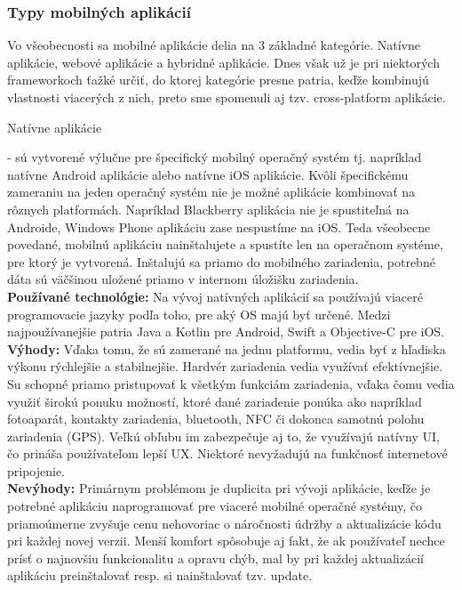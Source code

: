 \subsubsection{Typy mobilných aplikácií}
Vo všeobecnosti sa mobilné aplikácie delia na 3 základné kategórie. Natívne aplikácie, webové aplikácie a hybridné aplikácie. Dnes však už je pri niektorých frameworkoch ťažké určiť, do ktorej kategórie presne patria, keďže kombinujú vlastnosti viacerých z nich, preto sme spomenuli aj tzv. cross-platform aplikácie.
\begin{itemize}[leftmargin=*]
{\bf \item Natívne aplikácie} - sú vytvorené výlučne pre špecifický mobilný operačný systém tj. napríklad natívne Android aplikácie alebo natívne iOS aplikácie. Kvôli špecifickému zameraniu na jeden operačný systém nie je možné aplikácie kombinovať na rôznych platformách. Napríklad Blackberry aplikácia nie je spustiteľná na Androide, Windows Phone aplikáciu zase nespustíme na iOS. Teda všeobecne povedané, mobilnú aplikáciu nainštalujete a spustíte len na operačnom systéme, pre ktorý je vytvorená. Inštalujú sa priamo do mobilného zariadenia, potrebné dáta sú väčšinou uložené priamo v internom úložišku zariadenia. \\

{\bf Používané technológie:} Na vývoj natívných aplikácií sa používajú viaceré programovacie jazyky podľa toho, pre aký OS majú byť určené. Medzi najpoužívanejšie patria Java a Kotlin pre Android, Swift a Objective-C pre iOS. \\

{\bf Výhody:} Vďaka tomu, že sú zamerané na jednu platformu, vedia byť z hľadiska výkonu rýchlejšie a stabilnejšie. Hardvér zariadenia vedia využívať efektívnejšie. Su schopné priamo pristupovať k všetkým funkciám zariadenia, vďaka čomu vedia využiť širokú ponuku možností, ktoré dané zariadenie ponúka ako napríklad fotoaparát, kontakty zariadenia, bluetooth, NFC či dokonca samotnú polohu zariadenia (GPS). Veľkú obľubu im zabezpečuje aj to, že využívajú natívny UI, čo prináša používateľom lepší UX. Niektoré nevyžadujú na funkčnosť internetové pripojenie. \\
 
{\bf Nevýhody:}  Primárnym problémom je duplicita pri vývoji aplikácie, keďže je potrebné aplikáciu naprogramovať pre viaceré mobilné operačné systémy, čo priamoúmerne zvyšuje cenu nehovoriac o náročnosti údržby a aktualizácie kódu pri každej novej verzii. Menší komfort spôsobuje aj fakt, že ak používateľ nechce prísť o najnovšiu funkcionalitu a opravu chýb, mal by pri každej aktualizácií aplikáciu preinštalovať resp. si nainštalovať tzv. update. \\


\end{itemize}
